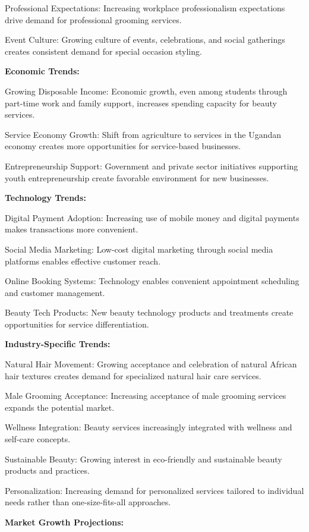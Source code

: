 Professional Expectations: Increasing workplace professionalism expectations drive demand for professional grooming services.

Event Culture: Growing culture of events, celebrations, and social gatherings creates consistent demand for special occasion styling.

\textbf{Economic Trends:}

Growing Disposable Income: Economic growth, even among students through part-time work and family support, increases spending capacity for beauty services.

Service Economy Growth: Shift from agriculture to services in the Ugandan economy creates more opportunities for service-based businesses.

Entrepreneurship Support: Government and private sector initiatives supporting youth entrepreneurship create favorable environment for new businesses.

\textbf{Technology Trends:}

Digital Payment Adoption: Increasing use of mobile money and digital payments makes transactions more convenient.

Social Media Marketing: Low-cost digital marketing through social media platforms enables effective customer reach.

Online Booking Systems: Technology enables convenient appointment scheduling and customer management.

Beauty Tech Products: New beauty technology products and treatments create opportunities for service differentiation.

\textbf{Industry-Specific Trends:}

Natural Hair Movement: Growing acceptance and celebration of natural African hair textures creates demand for specialized natural hair care services.

Male Grooming Acceptance: Increasing acceptance of male grooming services expands the potential market.

Wellness Integration: Beauty services increasingly integrated with wellness and self-care concepts.

Sustainable Beauty: Growing interest in eco-friendly and sustainable beauty products and practices.

Personalization: Increasing demand for personalized services tailored to individual needs rather than one-size-fits-all approaches.

\textbf{Market Growth Projections:}

